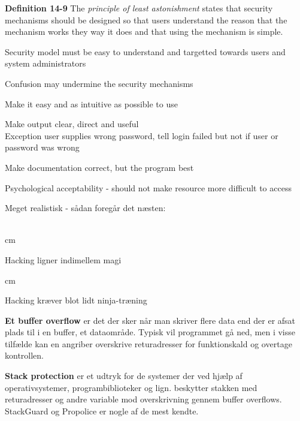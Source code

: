 \documentclass[Screen16to9,17pt]{foils}
\begin{document}

\begin{list1}
\item {\bf Definition 14-9} The \emph{principle of least astonishment} states that security mechanisms should be designed so that users understand the reason that the mechanism works they way it does and that using the mechanism is simple.
\item Security model must be easy to understand and targetted towards users and system administrators
\item Confusion may undermine the security mechanisms
\item Make it easy and as intuitive as possible to use
\item Make output clear, direct and useful\\
Exception user supplies wrong password, tell login failed but not if user or password was wrong
\item Make documentation correct, but the program best
\item Psychological acceptability - should not make resource more difficult to access
\end{list1}







Meget realistisk - sådan foregår det næsten:\\
\\





 cm

\centerline{Hacking ligner indimellem  magi}




 cm
\centerline{Hacking kræver blot lidt ninja-træning}




\begin{list1}
\item {\bfseries Et buffer overflow}
er det der sker når man skriver flere data end der er afsat plads til
i en buffer, et dataområde. Typisk vil programmet gå ned, men i visse
tilfælde kan en angriber overskrive returadresser for funktionskald og
overtage kontrollen.
\item {\bfseries Stack protection}
er et udtryk for de systemer der ved hjælp af operativsystemer,
programbiblioteker og lign. beskytter stakken med returadresser og
andre variable mod overskrivning gennem buffer overflows. StackGuard
og Propolice er nogle af de mest kendte.
\end{list1}
\end{document}
